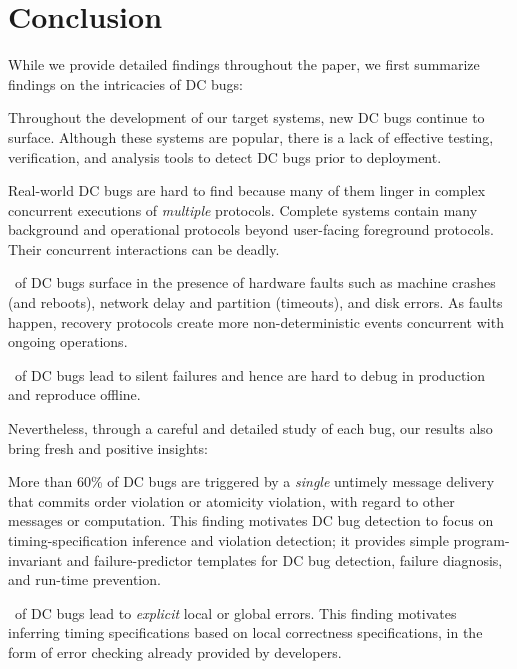 
\section{Conclusion}

While we provide detailed findings throughout the paper,
we first summarize findings on the intricacies of DC bugs:

\vnb Throughout the development of our target systems, new DC bugs
continue to surface.  Although these systems are popular, there is a
lack of effective testing, verification, and analysis tools to detect
DC bugs prior to deployment.

\vnb Real-world DC bugs are hard to find because many of them linger
in complex concurrent executions of {\em multiple} protocols.
Complete systems contain many background and operational
protocols beyond user-facing foreground protocols.  Their concurrent
interactions can be deadly.

\vnb \pctFaultYes\ of DC bugs surface in the presence of hardware
faults such as machine crashes (and reboots), network delay and
partition (timeouts), and disk errors.  As faults happen, recovery
protocols create more non-deterministic events concurrent with ongoing
operations.

\vnb \pctErrImp\ of DC bugs lead to silent failures and hence are hard
to debug in production and reproduce offline.



\vfive Nevertheless, through a careful and detailed study of each bug,
our results also bring fresh and positive insights:



\vnb More than 60\% of DC bugs are triggered by a {\em single} untimely
message delivery that commits order violation or atomicity violation,
with regard to other messages or computation.  This finding motivates
DC bug detection to focus on timing-specification inference and
violation detection; it provides simple program-invariant and
failure-predictor templates for DC bug detection, failure diagnosis,
and run-time prevention.

\vnb \pctErrExp\ of DC bugs lead to {\em explicit} local or global
errors.  This finding motivates inferring timing specifications based
on local correctness specifications, in the form of error checking
already provided by developers.

